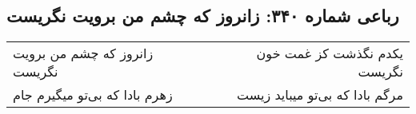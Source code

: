 \begin{center}
\section*{رباعی شماره ۳۴۰: زانروز که چشم من برویت نگریست}
\label{sec:0340}
\begin{longtable}{l p{0.5cm} r}
زانروز که چشم من برویت نگریست
&&
یکدم نگذشت کز غمت خون نگریست
\\
زهرم بادا که بی‌تو میگیرم جام
&&
مرگم بادا که بی‌تو میباید زیست
\\
\end{longtable}
\end{center}
